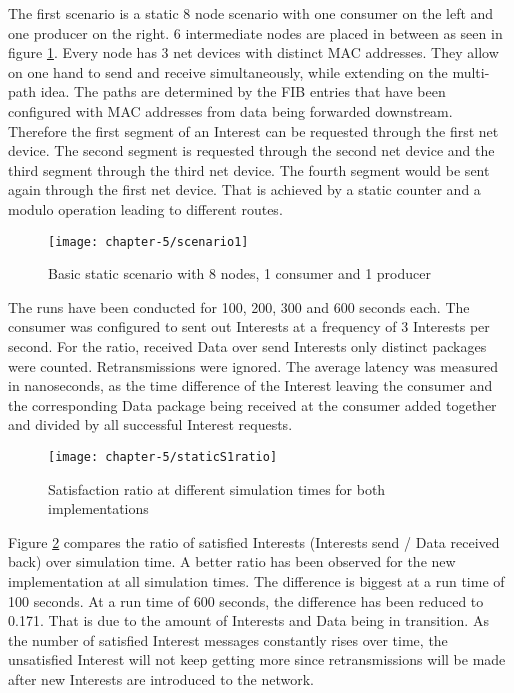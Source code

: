 The first scenario is a static 8 node scenario with one consumer on the left and one producer on the right. 6 intermediate nodes are placed in between as seen in figure \ref{fig:scenario1}. Every node has 3 net devices with distinct MAC addresses. They allow on one hand to send and receive simultaneously, while extending on the multi-path idea. The paths are determined by the FIB entries that have been configured with MAC addresses from data being forwarded downstream. Therefore the first segment of an Interest can be requested through the first net device. The second segment is requested through the second net device and the third segment through the third net device. The fourth segment would be sent again through the first net device. That is achieved by a static counter and a modulo operation leading to different routes.

\vspace{5mm} %

\begin{figure}[H]
  \centering
  \texttt{[image: chapter-5/scenario1]}
  \caption{Basic static scenario with 8 nodes, 1 consumer and 1 producer}
  \label{fig:scenario1}
\end{figure}

\vspace{5mm} %

The runs have been conducted for 100, 200, 300 and 600 seconds each. The consumer was configured to sent out Interests at a frequency of 3 Interests per second. For the ratio, received Data over send Interests only distinct packages were counted. Retransmissions were ignored. The average latency was measured in nanoseconds, as the time difference of the Interest leaving the consumer and the corresponding Data package being received at the consumer added together and divided by all successful Interest requests.

\vspace{5mm} %

\begin{figure}[H]
  \centering
  \texttt{[image: chapter-5/staticS1ratio]}
  \caption{Satisfaction ratio at different simulation times for both implementations}
  \label{fig:staticS1ratio}
\end{figure}

\vspace{5mm} %

Figure \ref{fig:staticS1ratio} compares the ratio of satisfied Interests (Interests send / Data received back) over simulation time. A better ratio has been observed for the new implementation at all simulation times. The difference is biggest at a run time of 100 seconds. At a run time of 600 seconds, the difference has been reduced to 0.171. That is due to the amount of Interests and Data being in transition. As the number of satisfied Interest messages constantly rises over time, the unsatisfied Interest will not keep getting more since retransmissions will be made after new Interests are introduced to the network.

